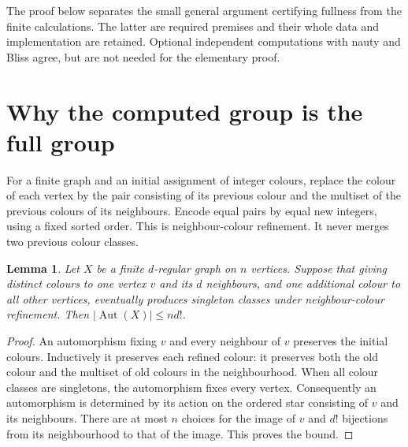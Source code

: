 \documentclass[11pt,a4paper]{article}
\newtheorem{lemma}[theorem]{Lemma}
\begin{document}
The proof below separates the small general argument certifying fullness
from the finite calculations.  The latter are required premises and their
whole data and implementation are retained.  Optional independent computations
with nauty and Bliss agree, but are not needed for the elementary proof.

\section{Why the computed group is the full group}
For a finite graph and an initial assignment of integer colours, replace the
colour of each vertex by the pair consisting of its previous colour and the
multiset of the previous colours of its neighbours.  Encode equal pairs by
equal new integers, using a fixed sorted order.  This is neighbour-colour
refinement.  It never merges two previous colour classes.

\begin{lemma}\label{lem:bound}
Let $X$ be a finite $d$-regular graph on $n$ vertices.  Suppose that giving
distinct colours to one vertex $v$ and its $d$ neighbours, and one additional
colour to all other vertices, eventually produces singleton classes under
neighbour-colour refinement.  Then $|\operatorname{Aut}(X)|\leq n d!$.
\end{lemma}
\begin{proof}
An automorphism fixing $v$ and every neighbour of $v$ preserves the initial
colours.  Inductively it preserves each refined colour: it preserves both
the old colour and the multiset of old colours in the neighbourhood.  When
all colour classes are singletons, the automorphism fixes every vertex.
Consequently an automorphism is determined by its action on the ordered
star consisting of $v$ and its neighbours.  There are at most $n$ choices
for the image of $v$ and $d!$ bijections from its neighbourhood to that of
the image.  This proves the bound.
\end{proof}
\end{document}
